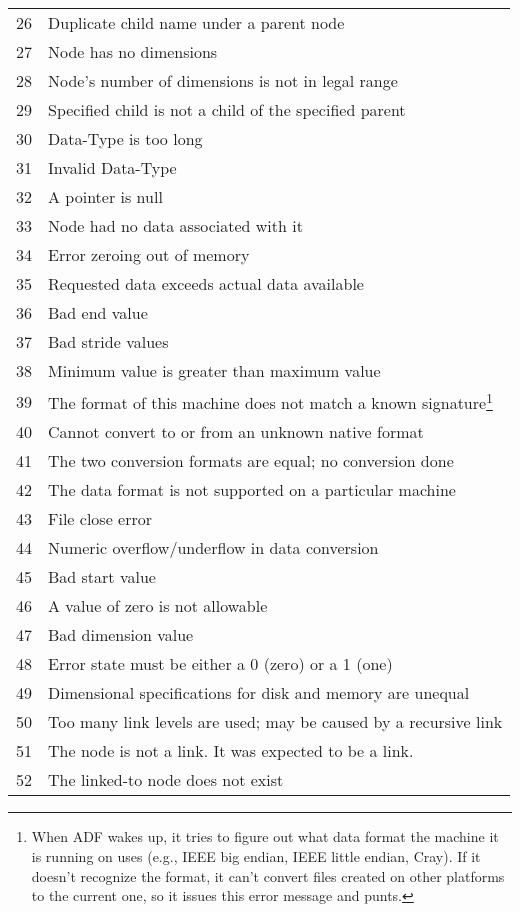 \begin{longtable}{c >{\raggedright\arraybackslash}p{\Pwidth}}
26 & Duplicate child name under a parent node \\
27 & Node has no dimensions \\
28 & Node's number of dimensions is not in legal range \\
29 & Specified child is not a child of the specified parent \\
30 & Data-Type is too long \\
31 & Invalid Data-Type \\
32 & A pointer is null \\
33 & Node had no data associated with it \\
34 & Error zeroing out of memory \\
35 & Requested data exceeds actual data available \\
36 & Bad end value \\
37 & Bad stride values \\
38 & Minimum value is greater than maximum value \\
39 & The format of this machine does not match a known signature\footnote{
     When ADF wakes up, it tries to figure out what data format the
     machine it is running on uses (e.g., IEEE big endian, IEEE little
     endian, Cray).
     If it doesn't recognize the format, it can't convert files created
     on other platforms to the current one, so it issues this error
     message and punts.} \\
40 & Cannot convert to or from an unknown native format \\
41 & The two conversion formats are equal; no conversion done \\
42 & The data format is not supported on a particular machine \\
43 & File close error \\
44 & Numeric overflow/underflow in data conversion \\
45 & Bad start value \\
46 & A value of zero is not allowable \\
47 & Bad dimension value \\
48 & Error state must be either a 0 (zero) or a 1 (one) \\
49 & Dimensional specifications for disk and memory are unequal \\
50 & Too many link levels are used; may be caused by a recursive link \\
51 & The node is not a link. It was expected to be a link. \\
52 & The linked-to node does not exist \\

\end{longtable}
